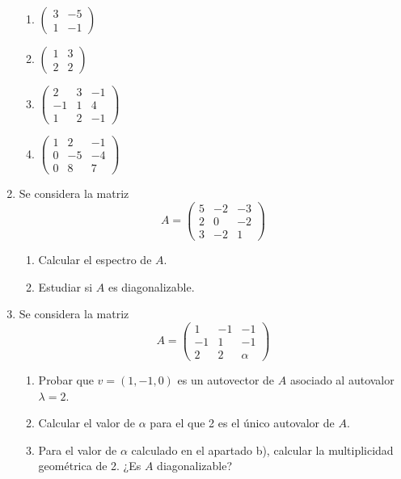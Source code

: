 \documentclass[12pt,letterpaper]{article}
\begin{document}
\begin{enumerate}
\begin{multicols}{3}
\begin{enumerate}
    \item $\begin{pmatrix}
      3 & -5\\
      1 & -1
    \end{pmatrix}$
    \item $\begin{pmatrix}
      1 & 3\\
      2 & 2
      \end{pmatrix}$
    \item $\begin{pmatrix}
      2 & 3 & -1\\
      -1 & 1 & 4\\
      1 & 2 & -1
    \end{pmatrix}$
    \item $\begin{pmatrix}
      1 & 2 & -1\\
      0 & -5 & -4\\
      0 & 8 & 7
    \end{pmatrix}$
    \end{enumerate}              
  \end{multicols}
  \item Se considera la matriz
  $$
  A=\begin{pmatrix}
    5 & -2 & -3\\
    2 & 0 & -2\\
    3 & -2 & 1
  \end{pmatrix}
  $$
  \begin{enumerate}
    \item Calcular el espectro de $A$.
    \item Estudiar si $A$ es diagonalizable.
  \end{enumerate}
  \item Se considera la matriz
  $$
  A=\begin{pmatrix}
    1 & -1 & -1\\
    -1 & 1 & -1\\
    2 & 2 & \alpha
  \end{pmatrix}
  $$
  \begin{enumerate}
    \item Probar que $v = (1,-1, 0)$ es un autovector de $A$ asociado al autovalor $\lambda = 2$.
    \item Calcular el valor de $\alpha$ para el que 2 es el único autovalor de $A$.
    \item Para el valor de $\alpha$ calculado en el apartado b), calcular la multiplicidad geométrica de 2. ¿Es $A$ diagonalizable?

\end{enumerate}
\end{enumerate}
\end{document}
